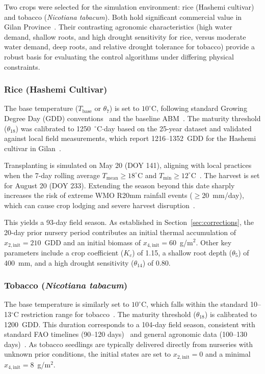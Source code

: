 Two crops were selected for the simulation environment: rice (Hashemi cultivar) and tobacco (\emph{Nicotiana tabacum}). Both hold significant commercial value in Gilan Province~\cite{surfiran2025, iranica_tobacco}. Their contrasting agronomic characteristics (high water demand, shallow roots, and high drought sensitivity for rice, versus moderate water demand, deep roots, and relative drought tolerance for tobacco) provide a robust basis for evaluating the control algorithms under differing physical constraints.

\subsubsection{Rice (Hashemi Cultivar)}

The base temperature ($T_{\text{base}}$ or $\theta_7$) is set to $10^{\circ}$C, following standard Growing Degree Day (GDD) conventions~\cite{mcmaster1997, laohasiriwong2023} and the baseline ABM~\cite{Lopezjimenez2024}. The maturity threshold ($\theta_{18}$) was calibrated to 1250~$^{\circ}$C$\cdot$day based on the 25-year dataset and validated against local field measurements, which report 1216--1352~GDD for the Hashemi cultivar in Gilan~\cite{sadidi2021}. 

Transplanting is simulated on May 20 (DOY 141), aligning with local practices when the 7-day rolling average $T_{\text{mean}} \geq 18^{\circ}$C and $T_{\min} \geq 12^{\circ}$C~\cite{paredes2025, faghani2011}. The harvest is set for August 20 (DOY 233). Extending the season beyond this date sharply increases the risk of extreme WMO R20mm rainfall events ($\geq$20~mm/day), which can cause crop lodging and severe harvest disruption~\cite{sarma2018, nayak2011}. 

This yields a 93-day field season. As established in Section~\ref{sec:corrections}, the 20-day prior nursery period contributes an initial thermal accumulation of $x_{2,\text{init}} = 210$~GDD and an initial biomass of $x_{4,\text{init}} = 60$~g/m$^2$. Other key parameters include a crop coefficient ($K_c$) of 1.15, a shallow root depth ($\theta_5$) of 400~mm, and a high drought sensitivity ($\theta_{14}$) of 0.80.

\subsubsection{Tobacco (\emph{Nicotiana tabacum})}

The base temperature is similarly set to $10^{\circ}$C, which falls within the standard 10--13$^{\circ}$C restriction range for tobacco~\cite{li2021}. The maturity threshold ($\theta_{18}$) is calibrated to 1200~GDD. This duration corresponds to a 104-day field season, consistent with standard FAO timelines (90--120 days)~\cite{fao_tobacco} and general agronomic data (100--130 days)~\cite{britannica1999}. As tobacco seedlings are typically delivered directly from nurseries with unknown prior conditions, the initial states are set to $x_{2,\text{init}} = 0$ and a minimal $x_{4,\text{init}} = 8$~g/m$^2$.


